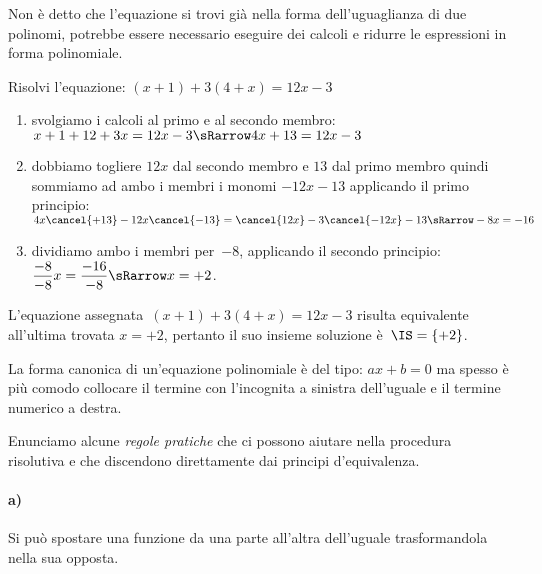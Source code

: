 
Non è detto che l'equazione si trovi già nella forma dell'uguaglianza 
di due polinomi, potrebbe essere necessario eseguire dei calcoli e 
ridurre le espressioni in forma polinomiale.

\begin{esempio}{}{}
Risolvi l'equazione: \quad \((x +1) +3(4 +x) = 12x -3\)

\vspace{.5em}
\begin{enumerate}
\item svolgiamo i calcoli al primo e al secondo membro:\\
\(x+1+12+3x=12x-3 \sRarrow 4x+13=12x-3\)
\item dobbiamo togliere \(12x\) dal secondo membro e \(13\) dal primo 
membro quindi sommiamo ad ambo i membri i monomi \(-12x -13\)
applicando il primo principio:\\
\(4x\cancel{+13}-12x\cancel{-13}=\cancel{12x}-3\cancel{-12x}-13 \sRarrow 
-8x=-16\)
\item dividiamo ambo i membri per~\(-8\),
applicando il secondo principio:\\ 
\(\dfrac{-8}{-8}x = \dfrac{-16}{-8} \sRarrow x = +2\).
\end{enumerate}

L'equazione assegnata~\((x +1) +3(4 +x) = 12x -3\)
risulta equivalente all'ultima trovata \(x = +2\), pertanto il
suo insieme soluzione è~\(\IS = \{+2\}\).
\end{esempio}


\begin{osservazione}{}{} 
La forma canonica di un'equazione polinomiale è del tipo: \(ax +b = 0\)
ma spesso è più comodo collocare il termine con l'incognita a sinistra 
dell'uguale e il termine numerico a destra.
\end{osservazione}

Enunciamo alcune \emph{regole pratiche}  
che ci possono aiutare nella procedura risolutiva e che discendono 
direttamente dai principi d'equivalenza.

\paragraph{a)} 
Si può spostare una funzione da una parte all'altra dell'uguale
trasformandola nella sua opposta.

